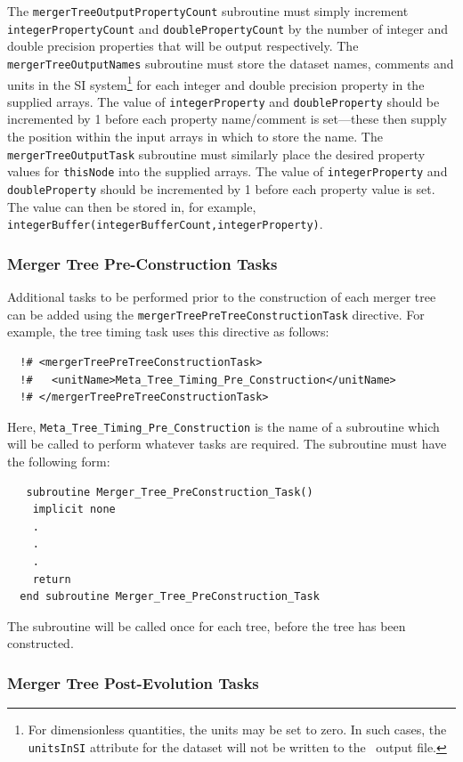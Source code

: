 The {\tt mergerTreeOutputPropertyCount} subroutine must simply increment {\tt integerPropertyCount} and {\tt doublePropertyCount} by the number of integer and double precision properties that will be output respectively. The {\tt mergerTreeOutputNames} subroutine must store the dataset names, comments and units in the SI system\footnote{For dimensionless quantities, the units may be set to zero. In such cases, the {\tt unitsInSI} attribute for the dataset will not be written to the \protect\glc\ output file.} for each integer and double precision property in the supplied arrays. The value of {\tt integerProperty} and {\tt doubleProperty} should be incremented by 1 before each property name/comment is set---these then supply the position within the input arrays in which to store the name. The {\tt mergerTreeOutputTask} subroutine must similarly place the desired property values for {\tt thisNode} into the supplied arrays. The value of {\tt integerProperty} and {\tt doubleProperty} should be incremented by 1 
before each property value is set. The value can then be stored in, for example, {\tt integerBuffer(integerBufferCount,integerProperty)}.

\subsubsection{Merger Tree Pre-Construction Tasks}\label{sec:MergerTreePreConstructionTask}

Additional tasks to be performed prior to the construction of each merger tree can be added using the {\tt mergerTreePreTreeConstructionTask} directive. For example, the tree timing task uses this directive as follows:
\begin{verbatim}
  !# <mergerTreePreTreeConstructionTask>
  !#   <unitName>Meta_Tree_Timing_Pre_Construction</unitName>
  !# </mergerTreePreTreeConstructionTask>
\end{verbatim}
Here, {\tt Meta\_Tree\_Timing\_Pre\_Construction} is the name of a subroutine which will be called to perform whatever tasks are required. The subroutine must have the following form:
\begin{verbatim}
   subroutine Merger_Tree_PreConstruction_Task()
    implicit none
    .
    .
    .
    return
  end subroutine Merger_Tree_PreConstruction_Task
\end{verbatim}
The subroutine will be called once for each tree, before the tree has been constructed.

\subsubsection{Merger Tree Post-Evolution Tasks}\label{sec:MergerTreePostEvolveTask}

